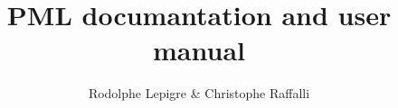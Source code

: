 \documentclass[oneside,a4]{book}
\begin{document}
\title{PML documantation and user manual}
\author{Rodolphe Lepigre \& Christophe Raffalli}
\date{}

\maketitle

\tableofcontents

\mainmatter

\appendix





\end{document}
